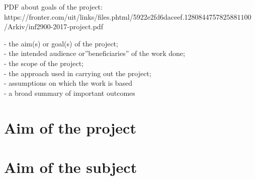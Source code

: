 

PDF about goals of the project: \\
https://fronter.com/uit/links/files.phtml/5922e2fd6daceef.1280844757$825881100$/Arkiv/inf2900-2017-project.pdf

- the aim(s) or goal(s) of the project;\\
- the intended audience or''beneficiaries'' of the work done;\\
- the scope of the project;\\
- the approach used in carrying out the project;\\
- assumptions on which the work is based\\
- a broad summary of important outcomes

\section{Aim of the project}

\section{Aim of the subject}